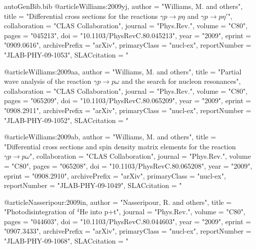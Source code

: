 \begin{filecontents*}{autoGenBib.bib}
@article{Williams:2009yj,
      author         = "Williams, M. and others",
      title          = "{Differential cross sections for the reactions $\gamma p \rightarrow p \eta$ and $\gamma p \rightarrow p \eta'$}",
      collaboration  = "CLAS Collaboration",
      journal        = "Phys.Rev.",
      volume         = "C80",
      pages          = "045213",
      doi            = "10.1103/PhysRevC.80.045213",
      year           = "2009",
      eprint         = "0909.0616",
      archivePrefix  = "arXiv",
      primaryClass   = "nucl-ex",
      reportNumber   = "JLAB-PHY-09-1053",
      SLACcitation   = "%
}

@article{Williams:2009aa,
      author         = "Williams, M. and others",
      title          = "{Partial wave analysis of the reaction $\gamma p \rightarrow p  \omega$ and the search for nucleon resonances}",
      collaboration  = "CLAS Collaboration",
      journal        = "Phys.Rev.",
      volume         = "C80",
      pages          = "065209",
      doi            = "10.1103/PhysRevC.80.065209",
      year           = "2009",
      eprint         = "0908.2911",
      archivePrefix  = "arXiv",
      primaryClass   = "nucl-ex",
      reportNumber   = "JLAB-PHY-09-1052",
      SLACcitation   = "%
}

@article{Williams:2009ab,
      author         = "Williams, M. and others",
      title          = "{Differential cross sections and spin density matrix elements for the reaction $\gamma p \rightarrow p \omega$}",
      collaboration  = "CLAS Collaboration",
      journal        = "Phys.Rev.",
      volume         = "C80",
      pages          = "065208",
      doi            = "10.1103/PhysRevC.80.065208",
      year           = "2009",
      eprint         = "0908.2910",
      archivePrefix  = "arXiv",
      primaryClass   = "nucl-ex",
      reportNumber   = "JLAB-PHY-09-1049",
      SLACcitation   = "%
}

@article{Nasseripour:2009in,
      author         = "Nasseripour, R. and others",
      title          = "{Photodisintegration of $^4$He into p+t}",
      journal        = "Phys.Rev.",
      volume         = "C80",
      pages          = "044603",
      doi            = "10.1103/PhysRevC.80.044603",
      year           = "2009",
      eprint         = "0907.3433",
      archivePrefix  = "arXiv",
      primaryClass   = "nucl-ex",
      reportNumber   = "JLAB-PHY-09-1068",
      SLACcitation   = "%
}


\end{filecontents*}

